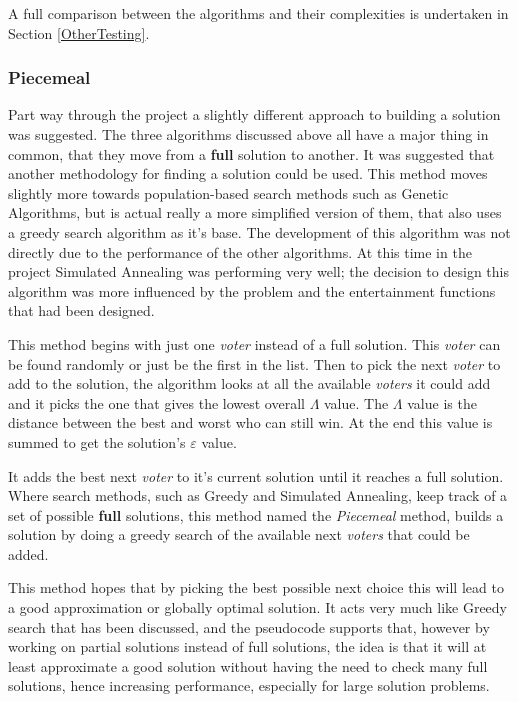 \documentclass[12pt]{report}
\begin{document}
A full comparison between the algorithms and their complexities is undertaken in Section \ref{OtherTesting}.


\subsubsection{Piecemeal}
Part way through the project a slightly different approach to building a solution was suggested. The three algorithms discussed above all have a major thing in common, that they move from a \textbf{full} solution to another. It was suggested that another methodology for finding a solution could be used. This method moves slightly more towards population-based search methods such as Genetic Algorithms, but is actual really a more simplified version of them, that also uses a greedy search algorithm as it's base. The development of this algorithm was not directly due to the performance of the other algorithms. At this time in the project Simulated Annealing was performing very well; the decision to design this algorithm was more influenced by the problem and the entertainment functions that had been designed.

This method begins with just one \textit{voter} instead of a full solution. This \textit{voter} can be found randomly or just be the first in the list. Then to pick the next \textit{voter} to add to the solution, the algorithm looks at all the available \textit{voters} it could add and it picks the one that gives the lowest overall $\Lambda$ value. The $\Lambda$ value is the distance between the best and worst who can still win. At the end this value is summed to get the solution's $\varepsilon$ value.

It adds the best next \textit{voter} to it's current solution until it reaches a full solution. Where search methods, such as Greedy and Simulated Annealing, keep track of a set of possible \textbf{full} solutions, this method named the \textit{Piecemeal} method, builds a solution by doing a greedy search of the available next \textit{voters} that could be added.

This method hopes that by picking the best possible next choice this will lead to a good approximation or globally optimal solution. It acts very much like Greedy search that has been discussed, and the pseudocode supports that, however by working on partial solutions instead of full solutions, the idea is that it will at least approximate a good solution without having the need to check many full solutions, hence increasing performance, especially for large solution problems.
\end{document}
